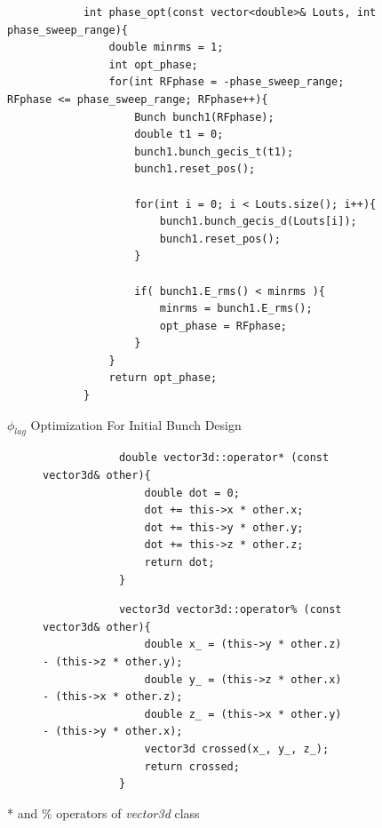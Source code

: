 \documentclass[a4paper,oneside,12pt]{report}
\numberwithin{equation}{chapter}
\begin{document}
\begin{figure}[H]
        \centering
        \captionsetup{justification=centering}
        \begin{verbatim}
            int phase_opt(const vector<double>& Louts, int phase_sweep_range){
                double minrms = 1;
                int opt_phase;
                for(int RFphase = -phase_sweep_range; RFphase <= phase_sweep_range; RFphase++){
                    Bunch bunch1(RFphase);
                    double t1 = 0;
                    bunch1.bunch_gecis_t(t1);
                    bunch1.reset_pos();
            
                    for(int i = 0; i < Louts.size(); i++){
                        bunch1.bunch_gecis_d(Louts[i]);
                        bunch1.reset_pos();
                    }
                        
                    if( bunch1.E_rms() < minrms ){
                        minrms = bunch1.E_rms();
                        opt_phase = RFphase;
                    }
                }
                return opt_phase;
            }
        \end{verbatim}
    \caption{$\phi_{lag}$ Optimization For Initial Bunch Design}
    \label{fig:phlag_opt_n_pass}
\end{figure}

\begin{figure}[H]
    \captionsetup[subfigure]{justification=centering}
    \captionsetup{justification=centering}
    \begin{subfigure}{\textwidth}
        \begin{verbatim}
            double vector3d::operator* (const vector3d& other){
                double dot = 0;
                dot += this->x * other.x;
                dot += this->y * other.y;
                dot += this->z * other.z;
                return dot;
            }
        \end{verbatim}
    \end{subfigure}

    \begin{subfigure}{\textwidth}
        \begin{verbatim}
            vector3d vector3d::operator% (const vector3d& other){
                double x_ = (this->y * other.z) - (this->z * other.y);
                double y_ = (this->z * other.x) - (this->x * other.z);
                double z_ = (this->x * other.y) - (this->y * other.x);
                vector3d crossed(x_, y_, z_);
                return crossed;
            }
        \end{verbatim}
    \end{subfigure}
    \caption{* and \% operators of \textit{vector3d} class}
    \label{fig:vector3d_dot_cross_product}
\end{figure}
\end{document}

